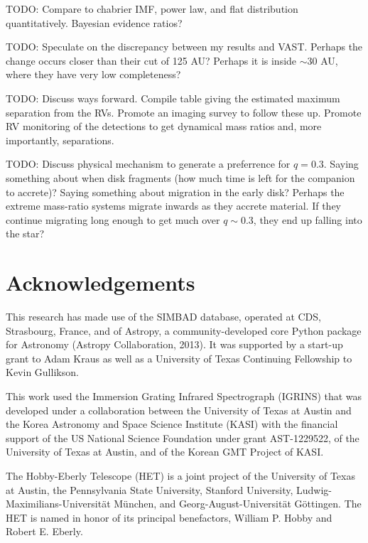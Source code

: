 \documentclass{emulateapj}
\begin{document}
TODO: Compare to chabrier IMF, power law, and flat distribution quantitatively. Bayesian evidence ratios?

TODO: Speculate on the discrepancy between my results and VAST. Perhaps the change occurs closer than their cut of 125 AU? Perhaps it is inside $\sim 30$ AU, where they have very low completeness?

TODO: Discuss ways forward. Compile table giving the estimated maximum separation from the RVs. Promote an imaging survey to follow these up. Promote RV monitoring of the detections to get dynamical mass ratios and, more importantly, separations.

TODO: Discuss physical mechanism to generate a preferrence for $q = 0.3$. Saying something about when disk fragments (how much time is left for the companion to accrete)? Saying something about migration in the early disk? Perhaps the extreme mass-ratio systems migrate inwards as they accrete material. If they continue migrating long enough to get much over $q \sim 0.3$, they end up falling into the star?





\section*{Acknowledgements}
This research has made use of the SIMBAD database, operated at CDS, Strasbourg, France, and of Astropy, a community-developed core Python package for Astronomy (Astropy Collaboration, 2013).
It was supported by a start-up grant to Adam Kraus as well as a University of Texas Continuing Fellowship to Kevin Gullikson.

This work used the Immersion Grating Infrared Spectrograph (IGRINS) that was developed under a collaboration between the University of Texas at Austin and the Korea Astronomy and Space Science Institute (KASI) with the financial support of the US National Science Foundation under grant AST-1229522, of the University of Texas at Austin, and of the Korean GMT Project of KASI.

The Hobby-Eberly Telescope (HET) is a joint project of the University of Texas at Austin, the Pennsylvania State University, Stanford University, Ludwig-Maximilians-Universit\"at M\"unchen, and Georg-August-Universit\"at G\"ottingen. The HET is named in honor of its principal benefactors, William P. Hobby and Robert E. Eberly.
\end{document}

